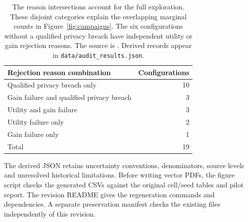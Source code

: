 \begin{table}[h]
\centering\small
\begin{tabular}{@{}lr@{}}
\toprule
Rejection reason combination & Configurations \\
\midrule
Qualified privacy breach only & 10 \\
Gain failure and qualified privacy breach & 3 \\
Utility and gain failure & 3 \\
Utility failure only & 2 \\
Gain failure only & 1 \\
\midrule
Total & 19 \\
\bottomrule
\end{tabular}
\caption{The reason intersections account for the full exploration.
These disjoint categories explain the overlapping marginal counts in
Figure~\ref{fig:campaigns}. The six configurations without a qualified
privacy breach have independent utility or gain rejection reasons.
The source is . Derived records appear in
\texttt{data/audit\_results.json}.}
\label{tab:intersections}
\end{table}

The derived JSON retains uncertainty conventions, denominators, source
levels and unresolved historical limitations. Before writing vector PDFs,
the figure script checks the generated CSVs against the original cell/seed
tables and pilot report. The revision README gives the regeneration
commands and dependencies. A separate preservation manifest checks the
existing  files independently of this revision.
